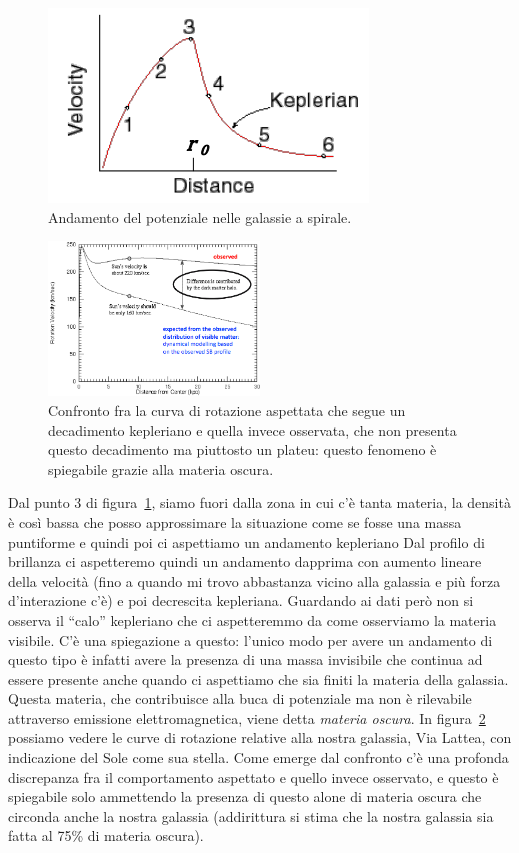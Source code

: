 \begin{figure}[htb]
    \centering
    \includegraphics[width = 0.4 \textwidth]{immagini/potenziale-galassie-a-spirale.png}
    \caption{Andamento del potenziale nelle galassie a spirale.}
    \label{fig:potenziale-galassie-a-spirale}
\end{figure}

\begin{figure}[htb]
    \centering
    \includegraphics[width= 0.5\textwidth]{immagini/confronto-curve-di-rotazione.png}
    \caption{Confronto fra la curva di rotazione aspettata che segue un decadimento kepleriano e quella invece osservata, che non presenta questo decadimento ma piuttosto un plateu: questo fenomeno è spiegabile grazie alla materia oscura.}
    \label{fig:confronto-curve-di-rotazione}
\end{figure}

Dal punto 3 di figura~\ref{fig:potenziale-galassie-a-spirale}, siamo fuori dalla zona in cui c’è tanta materia, la densità è così bassa che posso approssimare la situazione come se fosse una massa puntiforme e quindi poi ci aspettiamo un andamento kepleriano Dal profilo di brillanza ci aspetteremo quindi un andamento dapprima con aumento lineare della velocità (fino a quando mi trovo abbastanza vicino alla galassia e più forza d'interazione c'è) e poi decrescita kepleriana. Guardando ai dati però non si osserva il “calo” kepleriano che ci aspetteremmo da come osserviamo la materia visibile. C'è una spiegazione a questo: l'unico modo per avere un andamento di questo tipo è infatti avere la presenza di una massa invisibile che continua ad essere presente anche quando ci aspettiamo che sia finiti la materia della galassia. Questa materia, che contribuisce alla buca di potenziale ma non è rilevabile attraverso emissione elettromagnetica, viene detta \emph{materia oscura}. In figura~\ref{fig:confronto-curve-di-rotazione} possiamo vedere le curve di rotazione relative alla nostra galassia, Via Lattea, con indicazione del Sole come sua stella. Come emerge dal confronto c'è una profonda discrepanza fra il comportamento aspettato e quello invece osservato, e questo è spiegabile solo ammettendo la presenza di questo alone di materia oscura che circonda anche la nostra galassia (addirittura si stima che la nostra galassia sia fatta al 75\% di materia oscura).

